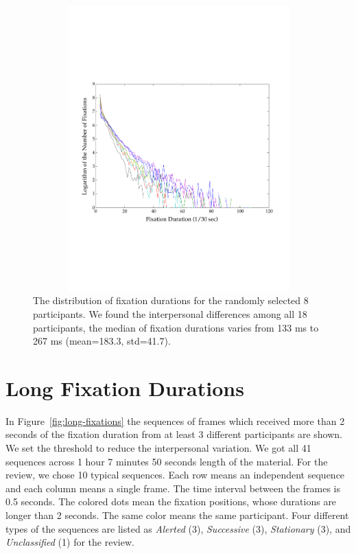\documentclass[oneside,master]{snueethesis}
\begin{document}
\begin{figure}
  \centerline{\includegraphics[width=150mm,height=110mm,trim=0mm 60mm 0mm 60mm]{./eps/individual_fixation_duration.pdf}}
  \caption[The distribution of fixation durations for individuals]{The distribution of fixation durations for the randomly selected 8 participants. We found the interpersonal differences among all 18 participants, the median of fixation durations varies from 133 ms to 267 ms (mean=183.3, std=41.7).}
  \label{fig:individual-fixation-duration}
\end{figure}


\section{Long Fixation Durations}
\label{subsec:Long-Fixation-Durations}

In Figure~\ref{fig:long-fixations} the sequences of frames which received more than 2 seconds of the fixation duration from at least 3 different participants are shown. We set the threshold to reduce the interpersonal variation. We got all 41 sequences across 1 hour 7 minutes 50 seconds length of the material. For the review, we chose 10 typical sequences. Each row means an independent sequence and each column means a single frame. The time interval between the frames is 0.5 seconds. The colored dots mean the fixation positions, whose durations are longer than 2 seconds. The same color means the same participant. Four different types of the sequences are listed as \textit{Alerted} (3), \textit{Successive} (3), \textit{Stationary} (3), and \textit{Unclassified} (1) for the review.
\end{document}

